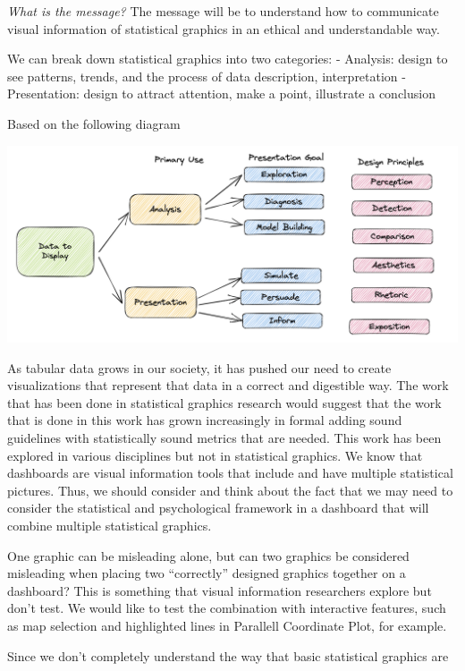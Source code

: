 \documentclass[print]{nuthesis}
\begin{document}
\emph{What is the message?}
The message will be to understand how to communicate visual information of statistical graphics in an ethical and understandable way.

We can break down statistical graphics into two categories:
- Analysis: design to see patterns, trends, and the process of data description, interpretation
- Presentation: design to attract attention, make a point, illustrate a conclusion

Based on the following diagram

\begin{center}
\includegraphics[width=\textwidth]{figure/RolesofGraphics}
\end{center}

As tabular data grows in our society, it has pushed our need to create visualizations that represent that data in a correct and digestible way. The work that has been done in statistical graphics research would suggest that the work that is done in this work has grown increasingly in formal adding sound guidelines with statistically sound metrics that are needed. This work has been explored in various disciplines but not in statistical graphics. We know that dashboards are visual information tools that include and have multiple statistical pictures. Thus, we should consider and think about the fact that we may need to consider the statistical and psychological framework in a dashboard that will combine multiple statistical graphics.

One graphic can be misleading alone, but can two graphics be considered misleading when placing two ``correctly'' designed graphics together on a dashboard? This is something that visual information researchers explore but don't test. We would like to test the combination with interactive features, such as map selection and highlighted lines in Parallell Coordinate Plot, for example.

Since we don't completely understand the way that basic statistical graphics are
\end{document}
